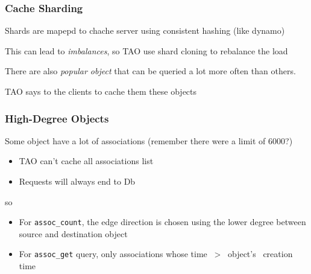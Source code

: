 \begin{frame}[c]\frametitle{Cache Sharding}
    Shards are mapepd to chache server using consistent hashing (like dynamo)

    This can lead to \emph{imbalances}, so TAO use shard cloning to rebalance the load

    There are also \emph{popular object} that can be queried a lot more often than others.

    TAO says to the clients to cache them these objects
\end{frame}

\begin{frame}[fragile]\frametitle{High-Degree Objects}
    Some object have a lot of associations (remember there were a limit of 6000?)
    \begin{itemize}
    	\item TAO can't cache all associations list
    	\item Requests will always end to Db
    \end{itemize}
    so
    \begin{itemize}
    	\item For \verb!assoc_count!, the edge direction is chosen using the lower degree between source and destination object
    	\item For \verb!assoc_get! query, only associations whose time~ >~ object's ~creation~ time
    \end{itemize}




\end{frame}